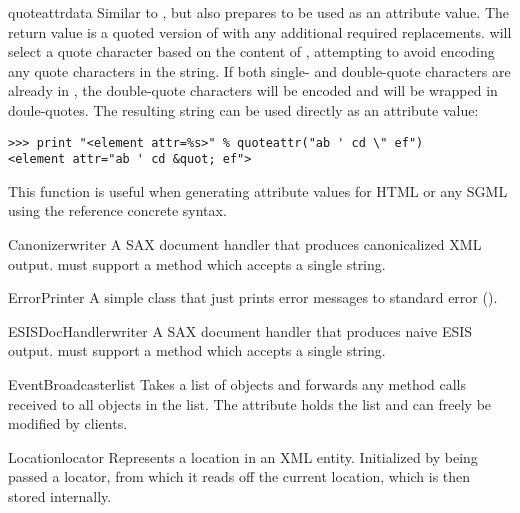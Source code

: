 \documentclass{howto}
\begin{document}
\begin{funcdesc}{quoteattr}{data}
  Similar to , but also prepares  to be
  used as an attribute value.  The return value is a quoted version of
   with any additional required replacements.
   will select a quote character based on the
  content of , attempting to avoid encoding any quote
  characters in the string.  If both single- and double-quote
  characters are already in , the double-quote characters
  will be encoded and  will be wrapped in doule-quotes.  The
  resulting string can be used directly as an attribute value:

\begin{verbatim}
>>> print "<element attr=%s>" % quoteattr("ab ' cd \" ef")
<element attr="ab ' cd &quot; ef">
\end{verbatim}

  This function is useful when generating attribute values for HTML or
  any SGML using the reference concrete syntax.
\end{funcdesc}

\begin{classdesc}{Canonizer}{writer}
A SAX document handler that produces canonicalized XML output.
 must support a  method which accepts a
single string.  
\end{classdesc}

\begin{classdesc}{ErrorPrinter}{}
A simple class that just prints error messages to standard error
().
\end{classdesc}

\begin{classdesc}{ESISDocHandler}{writer}
A SAX document handler that produces naive ESIS output.  
must support a  method which accepts a single string.
\end{classdesc}

\begin{classdesc}{EventBroadcaster}{list}
Takes a list of objects and forwards any method calls received
to all objects in the list. The attribute  holds the list and
can freely be modified by clients.
\end{classdesc}

\begin{classdesc}{Location}{locator}
Represents a location in an XML entity. Initialized by being passed
a locator, from which it reads off the current location, which is then
stored internally.
\end{classdesc}
\end{document}
